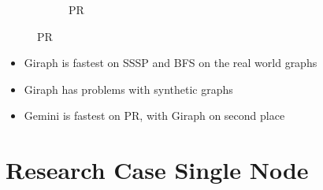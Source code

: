 \documentclass{meetings}
\begin{document}
\begin{figure}[h]
\begin{subfigure}{0.32\textwidth}
		\caption{PR}
	\end{subfigure}
\end{figure}
\begin{itemize}
	\item Giraph is fastest on SSSP and BFS on the real world graphs
	\item Giraph has problems with synthetic graphs
	\item Gemini is fastest on PR, with Giraph on second place
\end{itemize}











\section{Research Case Single Node}
\end{document}
